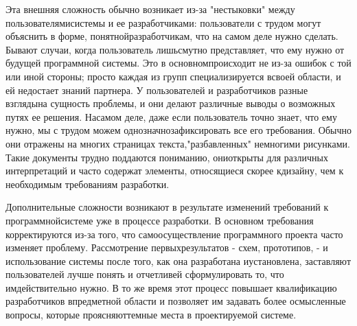 \documentclass[10pt]{article}
\begin{document}
Эта внешняя сложность обычно возникает из-за "нестыковки" между пользователями\linebreak  системы и ее разработчиками: пользователи с трудом могут объяснить в форме, понятной\linebreak  разработчикам, что на самом деле нужно сделать. Бывают случаи, когда пользователь лишь\linebreak  смутно представляет, что ему нужно от будущей программной системы. Это в основном\linebreak  происходит не из-за ошибок с той или иной стороны; просто каждая из групп специализируется в\linebreak  своей области, и ей недостает знаний партнера. У пользователей и разработчиков разные взгляды\linebreak  на сущность проблемы, и они делают различные выводы о возможных путях ее решения. На\linebreak  самом деле, даже если пользователь точно знает, что ему нужно, мы с трудом можем однозначно\linebreak  зафиксировать все его требования. Обычно они отражены на многих страницах текста,\linebreak  "разбавленных" немногими рисунками. Такие документы трудно поддаются пониманию, они\linebreak  открыты для различных интерпретаций и часто содержат элементы, относящиеся скорее к\linebreak  дизайну, чем к необходимым требованиям разработки.\vspace{3mm}
 
Дополнительные сложности возникают в результате изменений требований к программной\linebreak  системе уже в процессе разработки. В основном требования корректируются из-за того, что само\linebreak  осуществление программного проекта часто изменяет проблему. Рассмотрение первых\linebreak  результатов - схем, прототипов, - и использование системы после того, как она разработана и\linebreak  установлена, заставляют пользователей лучше понять и отчетливей сформулировать то, что им\linebreak  действительно нужно. В то же время этот процесс повышает квалификацию разработчиков в\linebreak  предметной области и позволяет им задавать более осмысленные вопросы, которые проясняют\linebreak  темные места в проектируемой системе. \vspace{3mm}
\end{document}
